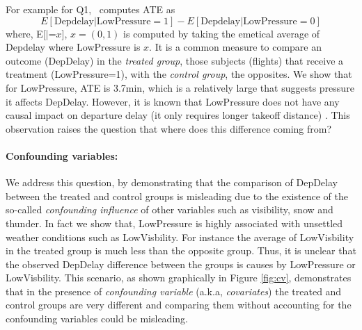  For example for Q1, \GSQL\ computes ATE as $$E[\text{Depdelay}|\text{LowPressure}=1] - E[\text{Depdelay}|\text{LowPressure}=0]$$
  where, E[|=$x$], $x=(0,1)$ is computed by taking the emetical average of  Depdelay where LowPressure is  $x$. It is a  common measure to compare an
  outcome (DepDelay) in the {\em treated group},  those subjects (flights) that receive a treatment (LowPressure=1), with the {\em control group}, the opposites.
  We show that for LowPressure, ATE is 3.7min, which is a relatively large that suggests pressure it affects DepDelay. However, it is known that
  LowPressure does not have any causal impact on departure delay (it only requires longer takeoff distance) \cite{FAA08}. This observation raises the question that  where does this difference coming from?


 \paragraph{\bf Confounding variables:}  We address this question, by demonstrating that the comparison of DepDelay between the treated and control groups is misleading due to the existence of the so-called {\em  confounding influence} of other variables such as visibility, snow and thunder.  In fact we show that, LowPressure is highly associated with unsettled weather conditions such as LowVisbility. For instance the average of LowVisbility in the treated group is much less than
  the opposite group. Thus, it is unclear that the observed DepDelay difference between the groups is causes by LowPressure or LowVisbility. This scenario, as shown graphically in Figure \ref{fig:cv}, demonstrates that in the presence of {\em confounding variable} (a.k.a, {\em covariates}) the treated and control groups are very different and comparing them without accounting for the confounding variables could be misleading.


